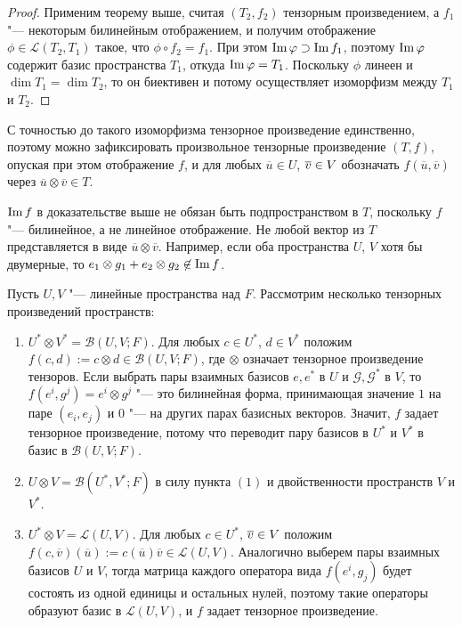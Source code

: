 \begin{proof}
	Применим теорему выше, считая $(T_2, f_2)$ тензорным произведением, а $f_1$ "--- некоторым билинейным отображением, и получим отображение $\phi \in \mathcal{L}(T_2, T_1)$ такое, что $\phi \circ f_2 = f_1$. При этом $\im{\phi} \hm{\supset} \im{f_1}$, поэтому $\operatorname{Im}{\varphi}$ содержит базис пространства $T_1$, откуда $\operatorname{Im}{\varphi} = T_1$. Поскольку $\phi$ линеен и $\dim{T_1} = \dim{T_2}$, то он биективен и потому осуществляет изоморфизм между $T_1$ и $T_2$.
\end{proof}

\begin{note}
	С точностью до такого изоморфизма тензорное произведение единственно, поэтому можно зафиксировать произвольное тензорные произведение $(T, f)$, опуская при этом отображение $f$, и для любых $\overline{u} \in U$, $\overline{v} \hm{\in} V$ обозначать $f(\overline{u}, \overline{v})$ через $\overline{u} \otimes \overline{v} \in T$.
\end{note}

\begin{note}
	$\operatorname{Im}{f}$ в доказательстве выше не обязан быть подпространством в $T$, поскольку $f$ "--- билинейное, а не линейное отображение. Не любой вектор из $T$ представляется в виде $\overline{u} \otimes \overline{v}$. Например, если оба пространства $U$, $V$ хотя бы двумерные, то ${e_1} \otimes {g_1} + {e_2} \otimes {g_2} \not\in \operatorname{Im} f$.
\end{note}

\begin{example}
	Пусть $U, V$ "--- линейные пространства над $F$. Рассмотрим несколько тензорных произведений пространств:
	\begin{enumerate}
		\item $U^* \otimes V^* = \mathcal{B}(U, V; F)$. Для любых $c \in U^*$, $d \in V^*$ положим $f(c, d) := c \otimes d \in \mathcal{B}(U, V; F)$, где $\otimes$ означает тензорное произведение тензоров. Если выбрать пары взаимных базисов $e, e^*$ в $U$ и $\mathcal{G}, \mathcal G^*$ в $V$, то $f(e^i, g^j) = e^i \otimes g^j$ "--- это билинейная форма, принимающая значение $1$ на паре $(e_i, e_j)$ и $0$ "--- на других парах базисных векторов. Значит, $f$ задает тензорное произведение, потому что переводит пару базисов в $U^*$ и $V^*$ в базис в $\mathcal{B}(U, V; F)$.
		
		\item $U \otimes V = \mathcal{B}(U^*, V^*; F)$ в силу пункта $(1)$ и двойственности пространств $V$ и $V^*$.
		
		\item $U^* \otimes V = \mathcal{L}(U, V)$. Для любых $c \in U^*$, $\overline{v} \hm{\in} V$ положим $f(c, \overline{v})(\overline{u}) := c(\overline{u})\overline{v} \in \mathcal{L}(U, V)$. Аналогично выберем пары взаимных базисов $U$ и $V$, тогда матрица каждого оператора вида $f(e^i, g_j)$ будет состоять из одной единицы и остальных нулей, поэтому такие операторы образуют базис в $\mathcal{L}(U, V)$, и $f$ задает тензорное произведение.
	\end{enumerate}
\end{example}

